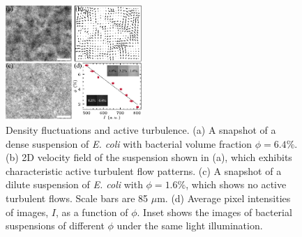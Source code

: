 \documentclass[twocolumn,aps,prx,amsmath,amssymb,longbibliography]{revtex4-2}
\begin{document}
\begin{figure}[t]
	\begin{center}
		\includegraphics[width=0.46\textwidth]{Figures/experiment/v5.pdf}
		\caption[Experimental details]
		{Density fluctuations and active turbulence.
			(a) A snapshot of a dense suspension of \textit{E. coli} with bacterial volume fraction $\phi = 6.4\%$.
			(b) 2D velocity field of the suspension shown in (a), which exhibits characteristic active turbulent flow patterns.
			(c) A snapshot of a dilute suspension of \textit{E. coli} with $\phi = 1.6\%$, which shows no active turbulent flows. Scale bars are 85 $\mu$m.
			(d) Average pixel intensities of images, $I$, as a function of $\phi$. Inset shows the images of bacterial suspensions of different $\phi$ under the same light illumination.
		}
		\label{fig:experiment}
	\end{center}
\end{figure}
\end{document}
